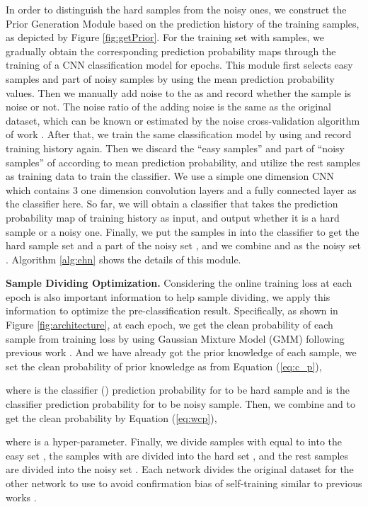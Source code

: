 \documentclass[letterpaper]{article} \usepackage{aaai22}  \usepackage{times}  \usepackage{helvet}  \usepackage{courier}  \usepackage[hyphens]{url}  \usepackage{graphicx} \urlstyle{rm} \def\UrlFont{\rm}  \usepackage{natbib}  \usepackage{caption} \DeclareCaptionStyle{ruled}{labelfont=normalfont,labelsep=colon,strut=off} \frenchspacing  \setlength{\pdfpagewidth}{8.5in}  \setlength{\pdfpageheight}{11in}  \usepackage{algorithm}
\begin{document}
In order to {distinguish the hard samples from the noisy ones}, we construct the Prior Generation Module based on the prediction history of the training samples, as depicted by Figure \ref{fig:getPrior}. For the training set  with  samples, we gradually obtain the corresponding  prediction probability maps through the training of a CNN classification model for  epochs. This module first selects easy samples  and part of noisy samples  by using the mean prediction probability values. Then we manually add noise to the  as  and record whether the sample is noise or not. The noise ratio of the adding noise is the same as the original dataset, {which can be known or estimated by the noise cross-validation algorithm of work \cite{chen2019understanding}.} After that, we train the same classification model by using  and record training history again. Then we discard the ``easy samples'' and part of ``noisy samples'' of  according to mean prediction probability, and utilize the rest samples as training data to train the classifier. We use a simple one dimension CNN which contains 3 one dimension convolution layers and a fully connected layer as the classifier here. So far, we will obtain a classifier that takes the prediction probability map of training history as input, and output whether it is a hard sample or a noisy one. Finally, we put the samples in  into the classifier to get the hard sample set  and a part of the noisy set , and we combine  and  as the noisy set . Algorithm \ref{alg:ehn} shows the details of this module.




\textbf{Sample Dividing Optimization.} Considering the online training loss at each epoch is also important information to help sample dividing, we apply this information to optimize the pre-classification result. Specifically, as shown in Figure \ref{fig:architecture}, at each epoch, we get the clean probability  of each sample from training loss by using Gaussian Mixture Model (GMM) following previous work \cite{2020DivideMix}. And we have already got the prior knowledge of each sample, we set the clean probability of prior knowledge as  from Equation (\ref{eq:c_p}), 

where  is the classifier () prediction probability for  to be hard sample and  is the classifier prediction probability for  to be noisy sample. Then, we combine  and  to get the clean probability  by Equation (\ref{eq:wcp}), 

where  is a hyper-parameter. Finally, we divide samples with  equal to  into the easy set , the samples with  are divided into the hard set , and the rest samples are divided into the noisy set . Each network divides the original dataset for the other network to use to avoid confirmation bias of self-training similar to previous works \cite{han2018co,chen2019understanding,2020DivideMix}.
\end{document}
